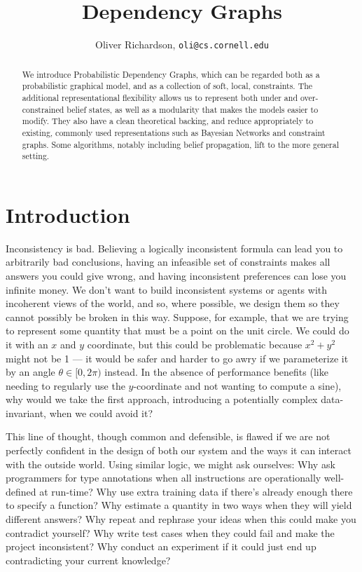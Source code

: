 \documentclass{article}
\title{Dependency Graphs}
\author{Oliver Richardson,  \texttt{oli@cs.cornell.edu}}
\newcommand{\modelnames}{Probabilistic Dependency Graphs}
\begin{document}
	\maketitle

	\begin{abstract}
		We introduce \modelnames, which can be regarded both as a probabilistic graphical model, and as a collection of soft, local, constraints. The additional representational flexibility allows us to represent both under and over-constrained belief states, as well as a modularity that makes the models easier to modify. They also have a clean theoretical backing, and reduce appropriately to existing, commonly used representations such as Bayesian Networks and constraint graphs. Some algorithms, notably including belief propagation, lift to the more general setting.
	\end{abstract}

	\section{Introduction}
	Inconsistency is bad. Believing a logically inconsistent formula can lead you to arbitrarily bad conclusions, having an infeasible set of constraints makes all answers you could give wrong, and having inconsistent preferences can lose you infinite money. We don't want to build inconsistent systems or agents with incoherent views of the world, and so, where possible, we design them so they cannot possibly be broken in this way. Suppose, for example, that we are trying to represent some quantity that must be a point on the unit circle. We could do it with an $x$ and $y$ coordinate, but this could be problematic because $x^2+ y^2$ might not be 1 --- it would be safer and harder to go awry if we parameterize it by an angle $\theta \in [0, 2\pi)$ instead. In the absence of performance benefits (like needing to regularly use the $y$-coordinate and not wanting to compute a sine), why would we take the first approach, introducing a potentially complex data-invariant, when we could avoid it?

	This line of thought, though common and defensible, is flawed if we are not perfectly confident in the design of both our system and the ways it can interact with the outside world. Using similar logic, we might ask ourselves: Why ask programmers for type annotations when all instructions are operationally well-defined at run-time?  Why use extra training data if there's already enough there to specify a function? Why estimate a quantity in two ways when they will yield different answers? Why repeat and rephrase your ideas when this could make you contradict yourself? Why write test cases when they could fail and make the project inconsistent? Why conduct an experiment if it could just end up contradicting your current knowledge?
\end{document}
